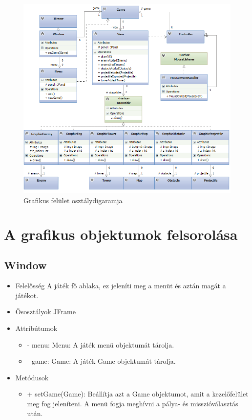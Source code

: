 \begin{figure}[H]
\begin{center}
\includegraphics[width=18cm]{images/ch11/very_uml_class_tiny.png}
\caption{Grafikus felület osztálydigaramja}
\label{fig:Graphic_class_diag}
\end{center}
\end{figure}

\section{A grafikus objektumok felsorolása}

\subsection{Window}
\begin{itemize}
\item Felelősség\newline
A játék fő ablaka, ez jeleníti meg a menüt és aztán magát a játékot.
\item Ősosztályok\newline
JFrame
\item Attribútumok\newline
	\begin{itemize}
		\item - menu: Menu: A játék menü objektumát tárolja.
		\item - game: Game: A játék Game objektumát tárolja.
	\end{itemize}
\item Metódusok\newline
	\begin{itemize}
		\item + setGame(Game): Beállítja azt a Game objektumot, amit a kezelőfelület meg fog jeleníteni. A menü fogja meghívni a pálya- és misszióválasztás után.
	\end{itemize}
\end{itemize}

